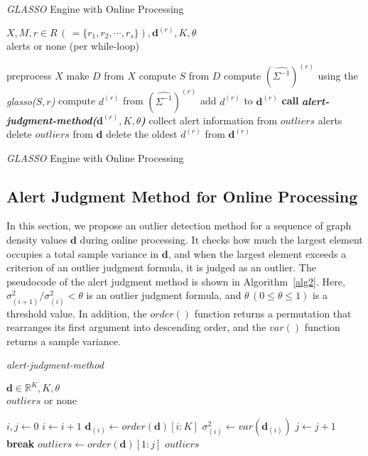 \documentclass[conference]{IEEEtran}
\begin{document}
\begin{algorithm}[tb]
\caption{\textit{GLASSO} Engine with Online Processing}
\label{alg1}
\begin{algorithmic}[1]
  \REQUIRE $X, M, r \in R \, ( \, = \{r_1, r_2, \cdots, r_s\} ), \bm{d}^{(r)}, K, \theta$\\
  \ENSURE alerts or none (per while-loop)

    \STATE preprocess $X$
    \STATE make $D$ from $X$
    \STATE compute $S$ from $D$
      \STATE compute ${(\hat{\Sigma^{-1}})}^{(r)}$ using the \textit{glasso($S,r$)}
      \STATE compute $d^{(r)}$ from ${(\hat{\Sigma^{-1}})}^{(r)}$
      \STATE add $d^{(r)}$ to $\bm{d}^{(r)}$
        \STATE \textbf{call} \textit{\textbf{alert-judgment-method($\bm{d}^{(r)}, K, \theta$)}}
          \STATE collect alert information from $outliers$
          \RETURN alerts
          \STATE delete $outliers$ from $\bm{d}$
        \ELSE
          \STATE delete the oldest $d^{(r)}$ from $\bm{d}^{(r)}$
        \ENDIF
  		\ENDIF
  	\ENDFOR
  \ENDWHILE
\end{algorithmic}
\caption{\textit{GLASSO} Engine with Online Processing}
\end{algorithm}



\subsection{Alert Judgment Method for Online Processing}
In this section, we propose an outlier detection method for a sequence of graph density values $\bm{d}$ during online processing.
It checks how much the largest element occupies a total sample variance in $\bm{d}$, and when the largest element exceeds a criterion of an outlier judgment formula, it is judged as an outlier.
The pseudocode of the alert judgment method is shown in Algorithm~\ref{alg2}.
Here, $\sigma^{2}_{(i+1)}/\sigma^{2}_{(i)}<\theta$ is an outlier judgment formula, and $\theta \, (0\leq \theta \leq 1)$ is a threshold value.
In addition, the $order()$ function returns a permutation that rearranges its first argument into descending order, and the $var()$ function returns a sample variance.


\begin{algorithm}[tb]
\caption{\textit{alert-judgment-method}}
\label{alg2}
\begin{algorithmic}[1]
  \REQUIRE $\bm{d}\in\mathbb{R}^{K}, K, \theta$\\
  \ENSURE $outliers$ or none

  \STATE $i, j \gets 0$
    \STATE $i \gets i + 1$
    \STATE $\bm{d}_{(i)} \gets order(\bm{d})[i:K]$
    \STATE $\sigma_{(i)}^2 \gets var(\bm{d}_{(i)})$
      \STATE $j \gets j + 1$
      \STATE \textbf{break}
    \ELSE
      \STATE $outliers \gets order(\bm{d})[1:j]$
      \RETURN $outliers$
    \ENDIF
  \ENDWHILE
\end{algorithmic}
\end{algorithm}
\end{document}
